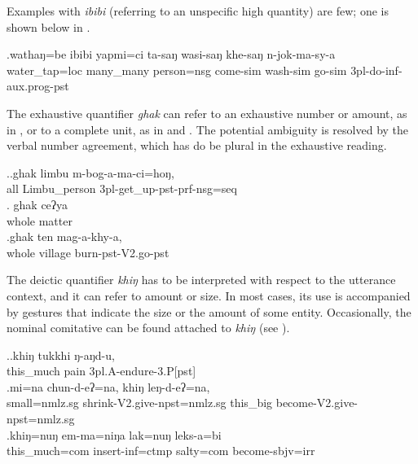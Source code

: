 Examples with \emph{ibibi} (referring to an unspecific high quantity) are few; one is shown below in \Next.

\exg.wathaŋ=be      ibibi     yapmi=ci     ta-saŋ        wasi-saŋ        khe-saŋ        n-jok-ma-sy-a\\
water\_tap{\sc =loc} many\_many person{\sc =nsg} come{\sc -sim} wash{\sc -sim} go{\sc -sim} {\sc 3pl-}do{\sc -inf-aux.prog-pst}\\
 

The exhaustive quantifier \emph{ghak}  can refer to an exhaustive number or amount, as in  \Next[a], or to a complete unit, as in \Next[b] and  \Next[c]. The potential ambiguity is resolved by the verbal number agreement, which has do be plural in the exhaustive reading.

\ex.\ag.ghak limbu          m-bog-a-ma-ci=hoŋ,\\
all Limbu\_person {\sc 3pl-}get\_up{\sc -pst-prf-nsg=seq}\\
  
\bg. ghak  ceʔya \\
whole matter\\
  
\bg.ghak ten     mag-a-khy-a,\\
whole village burn{\sc [3sg]-pst-V2.go-pst}\\
  

The deictic quantifier \emph{khiŋ} has to be interpreted with respect to the utterance context, and it can  refer to  amount or size. In most cases, its use is accompanied by  gestures that indicate the size or the amount of some entity. Occasionally,  the nominal comitative can be found attached to \emph{khiŋ}  (see \Next[c]).

\ex.\ag.khiŋ     tukkhi ŋ-aŋd-u,\\
this\_much pain {\sc 3pl.A-}endure{\sc -3.P[pst]}\\
  
\bg.mi=na  chun-d-eʔ=na,   khiŋ    leŋ-d-eʔ=na, \\
small{\sc =nmlz.sg} shrink{\sc [3sg]-V2.give-npst=nmlz.sg} this\_big become{\sc [3sg]-V2.give-npst=nmlz.sg}\\
  
\bg.khiŋ=nuŋ em-ma=niŋa lak=nuŋ leks-a=bi\\
this\_much{\sc =com} insert{\sc -inf=ctmp} salty{\sc =com} become{\sc [3sg]-sbjv=irr}\\

